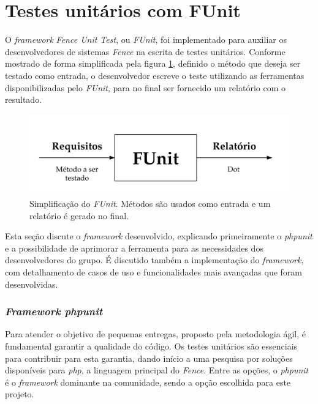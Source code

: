 \hypertarget{fence-unit-test}{%
\section{Testes unitários com FUnit}\label{fence-unit-test}}

O \emph{framework} \emph{Fence Unit Test}, ou \emph{FUnit}, foi implementado para auxiliar os desenvolvedores de sistemas \emph{Fence} na escrita de testes unitários. Conforme mostrado de forma simplificada pela figura \ref{fig:funit-esq}, definido o método que deseja ser testado como entrada, o desenvolvedor escreve o teste utilizando as ferramentas disponibilizadas pelo \emph{FUnit}, para no final ser fornecido um relatório com o resultado.

\begin{figure}[H]
    \centering
    \includegraphics[width=14cm]{source/4-solucao/images/funit-esq.png}
    \caption{Simplificação do \emph{FUnit}. Métodos são usados como entrada e um relatório é gerado no final.}
    \label{fig:funit-esq}
\end{figure}

Esta seção discute o \emph{framework} desenvolvido, explicando primeiramente o \emph{phpunit} e a possibilidade de aprimorar a ferramenta para as necessidades dos desenvolvedores do grupo. É discutido também a implementação do \emph{framework}, com detalhamento de casos de uso e funcionalidades mais avançadas que foram desenvolvidas.

\hypertarget{framework-phpunit}{%
\subsubsection{\texorpdfstring{\emph{Framework phpunit}}{Framework phpunit}}\label{framework-phpunit}}

Para atender o objetivo de pequenas entregas, proposto pela metodologia ágil, é fundamental garantir a qualidade do código. Os testes unitários são essenciais para contribuir para esta garantia, dando início a uma pesquisa por soluções disponíveis para \emph{php}, a linguagem principal do \emph{Fence}. Entre as opções, o \emph{phpunit} é o \emph{framework} dominante na comunidade, sendo a opção escolhida para este projeto.

